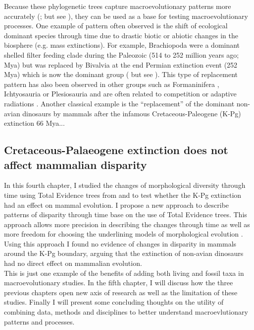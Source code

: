 Because these phylogenetic trees capture macroevolutionary patterns more accurately (\citealt{ronquista2012,schragocombining2013,slaterphylogenetic2013,beckancient2014,Dembo2015}; but see \citealt{Arcila2015131}), they can be used as a base for testing macroevolutionary processes.
One example of pattern often observed is the shift of ecological dominant species through time due to drastic biotic or abiotic changes in the biosphere (e.g. mass extinctions).
For example, Brachiopoda were a dominant shelled filter feeding clade during the Paleozoic (514 to 252 million years ago; Mya) but was replaced by Bivalvia at the end Permian extinction event (252 Mya) which is now the dominant group (\citealt{Sepkiski1981,CLAPHAM01102006} but see \citealt{Payne22052014}).
This type of replacement pattern has also been observed in other groups such as Formaninifera \citep{Coxall01042006}, Ichtyosauria \citep{thorneresetting2011} or Plesiosauria \citealt{bensonfaunal2014} and are often related to competition \citep{brusatte50} or adaptive radiations \citep{Losos2010}.
Another classical example is the ``replacement'' of the dominant non-avian dinosaurs by mammals after the infamous Cretaceous-Paleogene (K-Pg) extinction 66 Mya...

\subsection{Cretaceous-Palaeogene extinction does not affect mammalian disparity}
In this fourth chapter, I studied the changes of morphological diversity \citep[or disparity;][]{Wills1994} through time using Total Evidence trees from \cite{slaterphylogenetic2013} and \cite{beckancient2014} to test whether the K-Pg extinction had an effect on mammal evolution.
I propose a new approach to describe patterns of disparity through time base on the use of Total Evidence trees.
This approach allows more precision in describing the changes through time as well as more freedom for choosing the underlining models of morphological evolution \citep[e.g. punctuated or gradual;][]{Hunt21042015}.
Using this approach I found no evidence of changes in disparity in mammals around the K-Pg boundary, arguing that the extinction of non-avian dinosaurs had no direct effect on mammalian evolution.\\

This is just one example of the benefits of adding both living and fossil taxa in macroevolutionary studies.
In the fifth chapter, I will discuss how the three previous chapters open new axis of research %
as well as the limitation of these studies.
Finally I will present some concluding thoughts on the utility of combining data, methods and disciplines to better understand macroevlutionary patterns and processes.

%